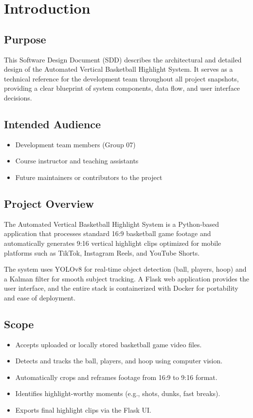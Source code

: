 \documentclass[12pt]{article}
\begin{document}
\newpage

\section{Introduction}

\subsection{Purpose}
This Software Design Document (SDD) describes the architectural and detailed design
of the Automated Vertical Basketball Highlight System. It serves as a technical
reference for the development team throughout all project snapshots, providing a
clear blueprint of system components, data flow, and user interface decisions.

\subsection{Intended Audience}
\begin{itemize}[noitemsep]
    \item Development team members (Group 07)
    \item Course instructor and teaching assistants
    \item Future maintainers or contributors to the project
\end{itemize}

\subsection{Project Overview}
The Automated Vertical Basketball Highlight System is a Python-based application
that processes standard 16:9 basketball game footage and automatically generates
9:16 vertical highlight clips optimized for mobile platforms such as TikTok,
Instagram Reels, and YouTube Shorts.

The system uses YOLOv8 for real-time object detection (ball, players, hoop) and a
Kalman filter for smooth subject tracking. A Flask web application provides the
user interface, and the entire stack is containerized with Docker for portability
and ease of deployment.

\subsection{Scope}
\begin{itemize}[noitemsep]
    \item Accepts uploaded or locally stored basketball game video files.
    \item Detects and tracks the ball, players, and hoop using computer vision.
    \item Automatically crops and reframes footage from 16:9 to 9:16 format.
    \item Identifies highlight-worthy moments (e.g., shots, dunks, fast breaks).
    \item Exports final highlight clips via the Flask UI.
\end{itemize}
\end{document}
